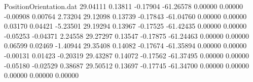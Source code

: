 \begin{filecontents}{PositionOrientation.dat}
  29.04111    0.13811   -0.17904   -61.26578    0.00000    0.00000   -0.00908    0.00764    2.73204
  29.12098    0.13739   -0.17843   -61.04760    0.00000    0.00000    0.03170    0.04421   -5.23501
  29.19294    0.13967   -0.17525   -61.42435    0.00000    0.00000   -0.05253   -0.04371    2.24558
  29.27297    0.13547   -0.17875   -61.24463    0.00000    0.00000    0.06599    0.02469   -1.40944
  29.35408    0.14082   -0.17674   -61.35894    0.00000    0.00000   -0.00131    0.01423   -0.20319
  29.43287    0.14072   -0.17562   -61.37495    0.00000    0.00000   -0.05180   -0.02529    0.38687
  29.50512    0.13697   -0.17745   -61.34700    0.00000    0.00000    0.00000    0.00000    0.00000
\end{filecontents}
